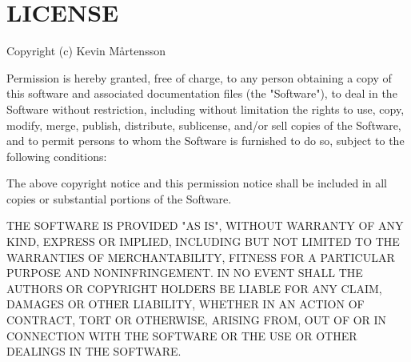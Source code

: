 \chapter{LICENSE}
\hypertarget{md__c_1_2_users_2_s_t_r_i_d_e_r_2source_2repos_2_internal_a_p_i_2_internal_a_p_i_2wwwroot_2lib_25c21bcc93e8a2af21fbe98eef2436365}{}\label{md__c_1_2_users_2_s_t_r_i_d_e_r_2source_2repos_2_internal_a_p_i_2_internal_a_p_i_2wwwroot_2lib_25c21bcc93e8a2af21fbe98eef2436365}
Copyright (c) Kevin Mårtensson

Permission is hereby granted, free of charge, to any person obtaining a copy of this software and associated documentation files (the "{}\+Software"{}), to deal in the Software without restriction, including without limitation the rights to use, copy, modify, merge, publish, distribute, sublicense, and/or sell copies of the Software, and to permit persons to whom the Software is furnished to do so, subject to the following conditions\+:

The above copyright notice and this permission notice shall be included in all copies or substantial portions of the Software.

THE SOFTWARE IS PROVIDED "{}\+AS IS"{}, WITHOUT WARRANTY OF ANY KIND, EXPRESS OR IMPLIED, INCLUDING BUT NOT LIMITED TO THE WARRANTIES OF MERCHANTABILITY, FITNESS FOR A PARTICULAR PURPOSE AND NONINFRINGEMENT. IN NO EVENT SHALL THE AUTHORS OR COPYRIGHT HOLDERS BE LIABLE FOR ANY CLAIM, DAMAGES OR OTHER LIABILITY, WHETHER IN AN ACTION OF CONTRACT, TORT OR OTHERWISE, ARISING FROM, OUT OF OR IN CONNECTION WITH THE SOFTWARE OR THE USE OR OTHER DEALINGS IN THE SOFTWARE. 